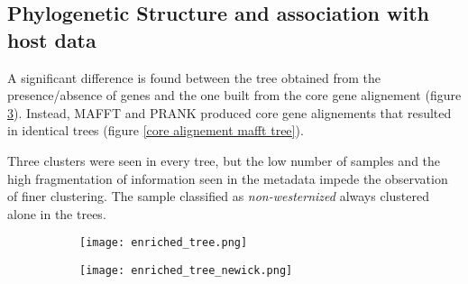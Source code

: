 \subsection*{Phylogenetic Structure and association with host data}
\graphicspath{{images/phylogeneticStructureHostData/}}



A significant difference is found between the tree obtained from the presence/absence of genes
and the one built from the core gene alignement (figure \ref{fig:phylogenetic trees}). Instead,
MAFFT and PRANK produced core gene alignements that resulted in identical trees (figure \ref{core alignement mafft tree}).

Three clusters were seen in every tree, but the low number of samples and the high fragmentation of
information seen in the metadata impede the observation of finer clustering. The sample 
classified as \emph{non-westernized} always clustered alone in the trees.


\begin{figure}[h!]
    \centering
    \begin{subfigure}[b]{0.7\textwidth}
        \centering
        \texttt{[image: enriched\_tree.png]}
        \caption{}
        \label{fig:core alignment prank tree}
    \end{subfigure}
    \begin{subfigure}[b]{0.7\textwidth}
        \centering
        \texttt{[image: enriched\_tree\_newick.png]}
        \caption{}
        \label{fig:presence absence tree}
    \end{subfigure}
       \caption{}
       \label{fig:phylogenetic trees}
\end{figure}


